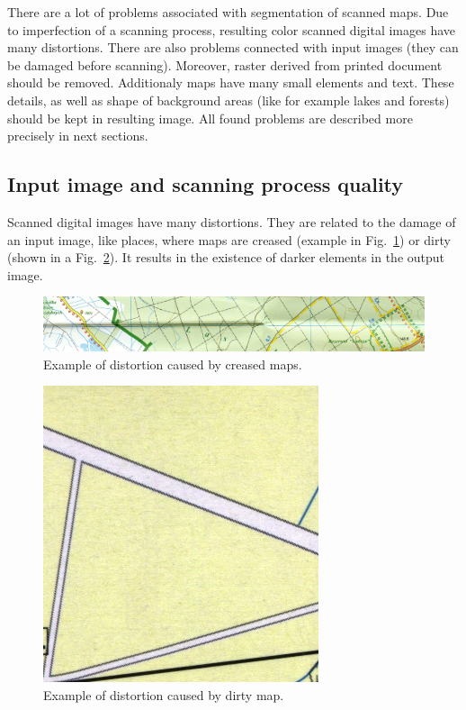 \documentclass[a4paper,onecolumn,oneside,12pt]{memoir}
\begin{document}
There are a lot of problems associated with segmentation of scanned maps. Due to imperfection of
a scanning process, resulting color scanned digital images have many distortions. There are also
problems connected with input images (they can be damaged before scanning). Moreover, raster derived
from printed document should be removed. Additionaly maps have many small elements and text. These
details, as well as shape of background areas (like for example lakes and forests) should be kept in
resulting image. All found problems are described more precisely in next sections.

\subsection{Input image and scanning process quality}

Scanned digital images have many distortions. They are related to the damage of an input image, like
places, where maps are creased (example in Fig.~\ref{creaseExample}) or dirty (shown in a 
Fig.~\ref{dirtyExample}). It results in the existence of darker elements in the output image.

\begin{figure}[!ht]
\begin{center}
\includegraphics[scale=1.1]{images/creaseExample.jpg}
\caption{Example of distortion caused by creased maps.}
\label{creaseExample}
\end{center}
\end{figure}

\begin{figure}[!ht]
\begin{center}
\includegraphics[scale=3.0]{images/dirtyExample.jpg}
\caption{Example of distortion caused by dirty map.}
\label{dirtyExample}
\end{center}
\end{figure}
\end{document}

